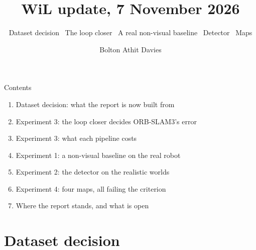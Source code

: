 \documentclass[11pt,aspectratio=169]{beamer}
\title{WiL update, 7 November 2026}
\subtitle{Dataset decision \textperiodcentered\ The loop closer \textperiodcentered\
          A real non-visual baseline \textperiodcentered\ Detector \textperiodcentered\ Maps}
\author{Bolton Athit Davies}
\date{}
\begin{document}
\begin{frame}
  \titlepage
\end{frame}

\begin{frame}{Contents}
  \begin{enumerate}
    \item Dataset decision: what the report is now built from
    \item Experiment 3: the loop closer decides ORB-SLAM3's error
    \item Experiment 3: what each pipeline costs
    \item Experiment 1: a non-visual baseline on the real robot
    \item Experiment 2: the detector on the realistic worlds
    \item Experiment 4: four maps, all failing the criterion
    \item Where the report stands, and what is open
  \end{enumerate}
\end{frame}

\section{Dataset decision}
\end{document}
